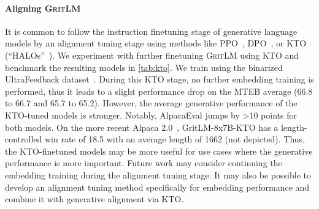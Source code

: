 \documentclass{article}
\newcommand{\model}{\textsc{GritLM}}
\begin{document}
\paragraph{Aligning \model{}} It is common to follow the instruction finetuning stage of generative language models by an alignment tuning stage using methods like PPO~\cite{schulman2017proximal}, DPO~\cite{rafailov2023direct}, or KTO~\cite{ethayarajh2024kto} (``HALOs''~\cite{ethayarajh2024kto}). We experiment with further finetuning \model{} using KTO and benchmark the resulting models in \autoref{tab:kto}. We train using the binarized UltraFeedback dataset~\cite{cui2023ultrafeedback}. During this KTO stage, no further embedding training is performed, thus it leads to a slight performance drop on the MTEB average (66.8 to 66.7 and 65.7 to 65.2). However, the average generative performance of the KTO-tuned models is stronger. Notably, AlpacaEval jumps by >10 points for both models. On the more recent Alpaca 2.0~\cite{dubois2024length}, GritLM-8x7B-KTO has a length-controlled win rate of 18.5 with an average length of 1662 (not depicted). Thus, the KTO-finetuned models may be more useful for use cases where the generative performance is more important. Future work may consider continuing the embedding training during the alignment tuning stage. It may also be possible to develop an alignment tuning method specifically for embedding performance and combine it with generative alignment via KTO.
\end{document}
